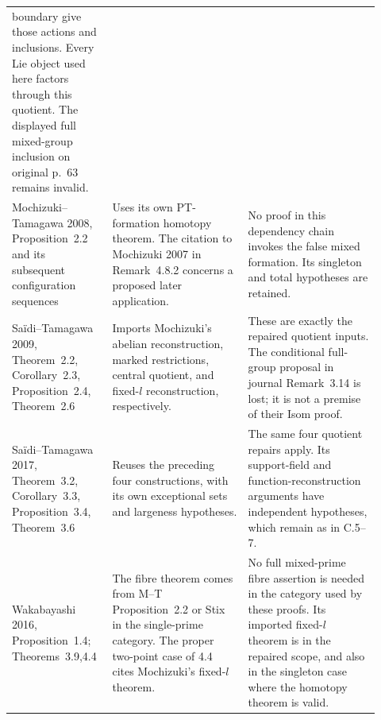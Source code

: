 \documentclass[11pt,a4paper]{article}
\begin{document}
\begin{center}
\begin{longtable}{p{0.23\linewidth}p{0.35\linewidth}p{0.34\linewidth}}
boundary give those actions and inclusions. Every Lie object
used here factors through this quotient. The displayed full
mixed-group inclusion on original p.~63 remains invalid.\\
Mochizuki--Tamagawa 2008, Proposition~2.2 and its subsequent
configuration sequences&
Uses its own PT-formation homotopy theorem. The citation to
Mochizuki 2007 in Remark~4.8.2 concerns a proposed later
application.&
No proof in this dependency chain invokes the false mixed
formation. Its singleton and total hypotheses are retained.\\
Sa\"idi--Tamagawa 2009, Theorem~2.2, Corollary~2.3,
Proposition~2.4, Theorem~2.6&
Imports Mochizuki's abelian reconstruction, marked restrictions,
central quotient, and fixed-$l$ reconstruction, respectively.&
These are exactly the repaired quotient inputs. The conditional
full-group proposal in journal Remark~3.14 is lost; it is not a
premise of their Isom proof.\\
Sa\"idi--Tamagawa 2017, Theorem~3.2, Corollary~3.3,
Proposition~3.4, Theorem~3.6&
Reuses the preceding four constructions, with its own exceptional
sets and largeness hypotheses.&
The same four quotient repairs apply. Its support-field and
function-reconstruction arguments have independent hypotheses,
which remain as in C.5--7.\\
Wakabayashi 2016, Proposition~1.4; Theorems~3.9,4.4&
The fibre theorem comes from M--T Proposition~2.2 or Stix in
the single-prime category. The proper two-point case of 4.4
cites Mochizuki's fixed-$l$ theorem.&
No full mixed-prime fibre assertion is needed in the category
used by these proofs. Its imported fixed-$l$ theorem is in the
repaired scope, and also in the singleton case where the
homotopy theorem is valid.\\
\bottomrule
\end{longtable}
\end{center}
\end{document}
